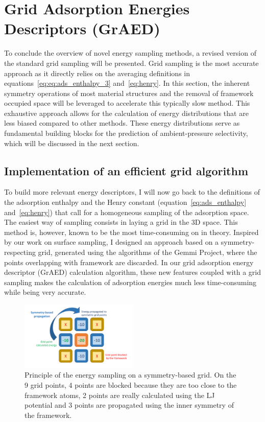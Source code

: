 \documentclass[main]{subfiles}
\begin{document}
\section{Grid Adsorption Energies Descriptors (GrAED)}\label{sct:grid}

To conclude the overview of novel energy sampling methods, a revised version of the standard grid sampling will be presented. Grid sampling is the most accurate approach as it directly relies on the averaging definitions in equations~\ref{eq:eq:ads_enthalpy_3} and~\ref{eq:henry}. In this section,  the inherent symmetry operations of most material structures and the removal of framework occupied space will be leveraged to accelerate this typically slow method. This exhaustive approach allows for the calculation of energy distributions that are less biased compared to other methods. These energy distributions serve as fundamental building blocks for the prediction of ambient-pressure selectivity, which will be discussed in the next section.

\subsection{Implementation of an efficient grid algorithm}

To build more relevant energy descriptors, I will now go back to the definitions of the adsorption enthalpy and the Henry constant (equation~\ref{eq:ads_enthalpy} and~\ref{eq:henry}) that call for a homogeneous sampling of the adsorption space. The easiest way of sampling consists in laying a grid in the 3D space. This method is, however, known to be the most time-consuming on in theory. Inspired by our work on surface sampling, I designed an approach based on a symmetry-respecting grid, generated using the algorithms of the Gemmi Project,\autocite{Wojdyr_2022} where the points overlapping with framework are discarded. In our grid adsorption energy descriptor (GrAED) calculation algorithm, these new features coupled with a grid sampling makes the calculation of adsorption energies much less time-consuming while being very accurate.

\begin{figure}[ht]
  \centering
    \includegraphics[width=0.5\textwidth]{figures/3-fastsim/grid_sampling.pdf}
    \caption{Principle of the energy sampling on a symmetry-based grid. On the 9 grid points, 4 points are blocked because they are too close to the framework atoms, 2 points are really calculated using the LJ potential and 3 points are propagated using the inner symmetry of the framework.}\label{fgr:principle_grid}
\end{figure}
\end{document}
